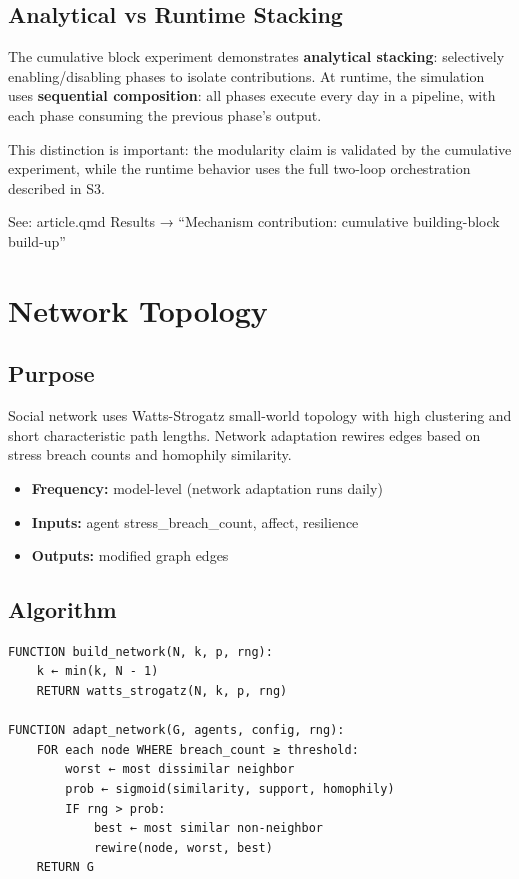 \documentclass[
  letterpaper,
  DIV=11,
  numbers=noendperiod]{scrartcl}
\providecommand{\tightlist}{%
  \setlength{\itemsep}{0pt}\setlength{\parskip}{0pt}}
\begin{document}
\subsection{Analytical vs Runtime
Stacking}\label{analytical-vs-runtime-stacking}

The cumulative block experiment demonstrates \textbf{analytical
stacking}: selectively enabling/disabling phases to isolate
contributions. At runtime, the simulation uses \textbf{sequential
composition}: all phases execute every day in a pipeline, with each
phase consuming the previous phase's output.

This distinction is important: the modularity claim is validated by the
cumulative experiment, while the runtime behavior uses the full two-loop
orchestration described in S3.

See: article.qmd Results → ``Mechanism contribution: cumulative
building-block build-up''

\section{Network Topology}\label{network-topology}

\subsection{Purpose}\label{purpose-12}

Social network uses Watts-Strogatz small-world topology with high
clustering and short characteristic path lengths. Network adaptation
rewires edges based on stress breach counts and homophily similarity.

\begin{itemize}
\tightlist
\item
  \textbf{Frequency:} model-level (network adaptation runs daily)
\item
  \textbf{Inputs:} agent stress\_breach\_count, affect, resilience
\item
  \textbf{Outputs:} modified graph edges
\end{itemize}

\subsection{Algorithm}\label{algorithm-9}

\begin{verbatim}
FUNCTION build_network(N, k, p, rng):
    k ← min(k, N - 1)
    RETURN watts_strogatz(N, k, p, rng)

FUNCTION adapt_network(G, agents, config, rng):
    FOR each node WHERE breach_count ≥ threshold:
        worst ← most dissimilar neighbor
        prob ← sigmoid(similarity, support, homophily)
        IF rng > prob:
            best ← most similar non-neighbor
            rewire(node, worst, best)
    RETURN G
\end{verbatim}
\end{document}
